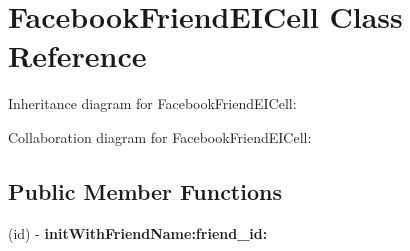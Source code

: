 \hypertarget{interface_facebook_friend_e_i_cell}{
\section{\-Facebook\-Friend\-E\-I\-Cell \-Class \-Reference}
\label{interface_facebook_friend_e_i_cell}
}


\-Inheritance diagram for \-Facebook\-Friend\-E\-I\-Cell\-:


\-Collaboration diagram for \-Facebook\-Friend\-E\-I\-Cell\-:
\subsection*{\-Public \-Member \-Functions}
\begin{DoxyCompactItemize}
\item 
\hypertarget{interface_facebook_friend_e_i_cell_a7c0c05f94f0e0b54de5f1c2902722458}{
(id) -\/ {\bfseries init\-With\-Friend\-Name\-:friend\-\_\-id\-:}}
\label{interface_facebook_friend_e_i_cell_a7c0c05f94f0e0b54de5f1c2902722458}

\end{DoxyCompactItemize}
